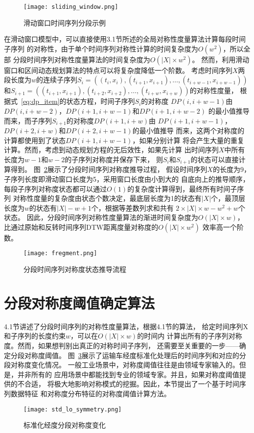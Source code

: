 \begin{figure}
  \centering
  \texttt{[image: sliding\_window.png]}
  \caption{滑动窗口时间序列分段示例}
  \label{fig:sliding_window}
\end{figure}

在滑动窗口模型中，可以直接使用3.1节所述的全局对称性度量算法计算每段时间子序列
的对称性，由于单个时间序列对称性计算的时间复杂度为$O(w^2 )$，所以全部
分段时间序列对称性度量算法的时间复杂度为$O\left(|X| \times w^{2}\right)$。
然而，利用滑动窗口和区间动态规划算法的特点可以将复杂度降低一个阶数。
考虑时间序列$X$两段长度为$w$的连续子序列$S_{i}=\left(\left(t_{i}, x_{i}\right),\left(t_{i+1}, x_{i+1}\right), \dots,\left(t_{i+w-1}, x_{i+w-1}\right)\right)$
和$S_{i+1}=\left(\left(t_{i+1}, x_{i+1}\right),\left(t_{i+2}, x_{i+2}\right), \dots,\left(t_{i+w}, x_{i+w}\right)\right)$的对称性度量，
根据式~\ref{eq:dp_item}的状态方程，时间子序列$S_i$的对称度
$D P(i, i+w-1)$由$DP(i,i+w-2)$，$DP(i+1,i+w-1)$和$DP(i+1,i+w-2)$
的最小值推导而来，而子序列$S_{i+1}$的对称度$D P(i+1, i+w)$由
$D P(i+1, i+w-1)$，$DP(i+2,i+w)$和$DP(i+2,i+w-1)$的最小值推导
而来，这两个对称度的计算都使用到了状态$DP(i+1,i+w-1)$，如果分别计算
将会产生大量的重复计算。然而，考虑到动态规划方程的无后效性，如果先计算
出时间序列$X$中所有长度为$w-1$和$w-2$的子序列对称度并保存下来，
则$S_i$和$S_{i+1}$的状态可以直接计算得到。
图~\ref{fig:fregment}展示了分段时间序列对称度推导过程，
假设时间序列$X$的长度为9，子序列长度即滑动窗口长度为5，采用窗口长度由小到大的
自底向上的推导顺序，每段子序列对称度状态都可以通过$O(1)$的复杂度计算得到，最终所有时间子序列
对称性度量的复杂度由状态个数决定，最底层长度为1的状态有$|X|$个，最顶层
长度为$w$的状态有$|X|-w+1$个，根据等差数列求和共有
$2 \times|X| \times w-w^{2}+w$个状态。
因此，分段时间序列对称性度量算法的渐进时间复杂度为$O(|X| \times w)$，
比通过原始和反转时间序列DTW距离度量对称度的$O\left(|X| \times w^{2}\right)$
效率高一个阶数。
\begin{figure}
  \centering
  \texttt{[image: fregment.png]}
  \caption{分段时间序列对称度状态推导流程}
  \label{fig:fregment}
\end{figure}

\section{分段对称度阈值确定算法}

4.1节讲述了分段时间序列的对称性度量算法，根据4.1节的算法，
给定时间序列X和子序列的长度约束$w$，可以在$O(|X| \times w)$的时间内
计算出所有的子序列对称度。然而，如果想判别出真正的对称时间子序列，
还需要至关重要的一步——确定分段对称度阈值。
图~\ref{fig:lontitude_symmetry}展示了运输车经度标准化处理后的时间序列和对应的分段对称度变化情况。
一般工业场景中，对称度阈值往往是由领域专家输入的。但是，并非所有的
应用场景中都能找到专业的领域专家。并且，如果对称度阈值提供的不合适，
将极大地影响对称模式的挖掘。因此，本节提出了一个基于时间序列数据特征
和对称度分布特征的对称度阈值计算方法。
\begin{figure}
  \centering
  \texttt{[image: std\_lo\_symmetry.png]}
  \caption{标准化经度分段对称度变化}
  \label{fig:lontitude_symmetry}
\end{figure}

